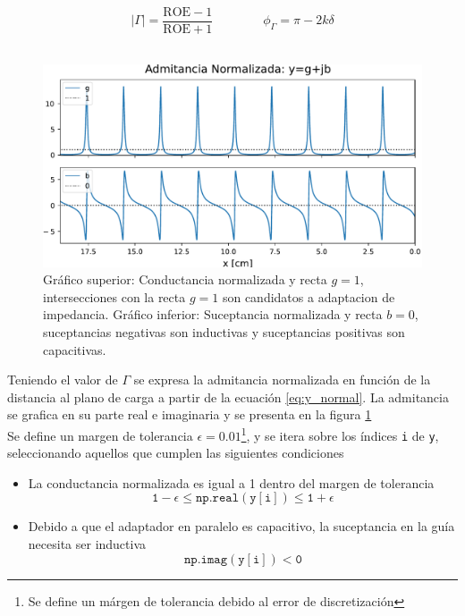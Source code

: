 \documentclass[11pt,a4paper]{article}
\begin{document}
\begin{appendices}
\begin{multicols}{2}
    \begin{equation}
        \left|\Gamma\right| = \frac{\mathrm{ROE}-1}{\mathrm{ROE}+1}\qquad\qquad \phi_\Gamma = \pi-2k\delta
    \end{equation}\\[-1em]

    \begin{figure}[H]
        \centering
        \includegraphics[width=\linewidth]{Images/ydex.pdf}
        \caption{Gráfico superior: Conductancia normalizada y recta $g=1$, intersecciones con la recta $g=1$ son candidatos a adaptacion de impedancia.
            Gráfico inferior: Suceptancia normalizada y recta $b=0$, suceptancias negativas son inductivas y suceptancias positivas son capacitivas.}
        \label{fig:ydex}
    \end{figure}
    Teniendo el valor de $\Gamma$ se expresa la admitancia normalizada en función de la distancia al plano de carga a partir de la ecuación \ref{eq:y_normal}. La admitancia se grafica en su parte real e imaginaria y se presenta en la figura \ref{fig:ydex}\\

    Se define un margen de tolerancia $\epsilon = 0.01$\footnote{Se define un márgen de tolerancia debido al error de discretización}, y se itera sobre los índices \texttt{i} de \texttt{y}, seleccionando aquellos que cumplen las siguientes condiciones

    \begin{itemize}
        \item La conductancia normalizada es igual a 1 dentro del margen de tolerancia
        $$\mathtt{ 1-\epsilon \le np.real(y[i]) \le  1+\epsilon}$$
        \item Debido a que el adaptador en paralelo es capacitivo, la suceptancia en la guía necesita ser inductiva
        $$\mathtt{np.imag(y[i])< 0}$$
    \end{itemize}


\end{multicols}
\end{appendices}
\end{document}
